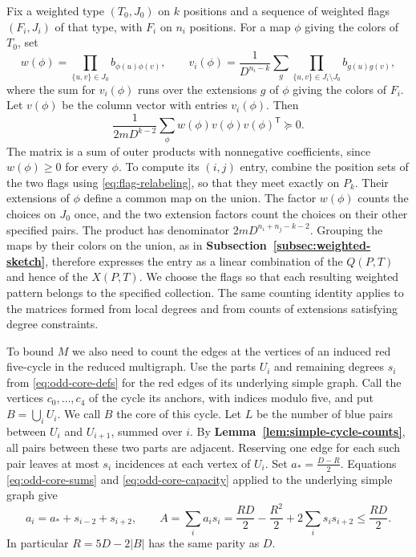 \documentclass[preprint,11pt,numbers]{elsarticle-arxiv}
\numberwithin{equation}{section}
\theoremstyle{definition}
\begin{document}
Fix a weighted type $(T_0,J_0)$ on $k$ positions and a sequence
of weighted flags $(F_i,J_i)$ of that type, with $F_i$ on $n_i$
positions. For a map $\phi$ giving the colors of $T_0$, set
\[
 w(\phi)=\prod_{\{u,v\}\in J_0}b_{\phi(u)\phi(v)},\qquad
 v_i(\phi)=\frac{1}{D^{n_i-k}}
    \sum_g\prod_{\{u,v\}\in J_i\setminus J_0}b_{g(u)g(v)},
\]
where the sum for $v_i(\phi)$ runs over the extensions $g$ of $\phi$
giving the colors of $F_i$. Let $v(\phi)$ be the column vector
with entries $v_i(\phi)$. Then
\[
 \frac{1}{2mD^{k-2}}\sum_\phi w(\phi)v(\phi)v(\phi)^{\mathsf T}\succeq0.
\]
The matrix is a sum of outer products with nonnegative coefficients,
since $w(\phi)\geq0$ for every $\phi$. To compute its $(i,j)$ entry,
combine the position sets of the two flags using
\eqref{eq:flag-relabeling}, so that they meet exactly on $P_k$.
Their extensions of $\phi$ define a common map on the union.
The factor $w(\phi)$ counts the choices on $J_0$ once, and the
two extension factors count the choices on their other specified
pairs. The product has denominator $2mD^{n_i+n_j-k-2}$.
Grouping the maps by their colors on the union, as in
\textbf{Subsection~\ref{subsec:weighted-sketch}}, therefore expresses
the entry as a linear combination of the $Q(P,T)$ and hence of
the $X(P,T)$. We choose the flags so that each resulting weighted
pattern belongs to the specified collection.
The same counting identity applies to the matrices formed from local
degrees and from counts of extensions satisfying degree constraints.

To bound $M$ we also need to count the edges at the vertices of an
induced red five-cycle in the reduced multigraph. Use the parts $U_i$
and remaining degrees $s_i$ from \eqref{eq:odd-core-defs} for the red
edges of its underlying simple graph. Call the vertices $c_0,\ldots,c_4$ of
the cycle its anchors, with indices modulo five, and put
$B=\bigcup_i U_i$. We call $B$ the core of this cycle.
Let $L$ be the number of blue pairs between $U_i$ and $U_{i+1}$,
summed over $i$. By \textbf{Lemma~\ref{lem:simple-cycle-counts}},
all pairs between these two parts are adjacent. Reserving one edge
for each such pair leaves at most $s_i$ incidences at each vertex of
$U_i$. Set $a_*=\frac{D-R}{2}$. Equations \eqref{eq:odd-core-sums}
and \eqref{eq:odd-core-capacity} applied to the underlying simple graph give
\begin{equation}\label{eq:multi-core-identities}
 a_i=a_*+s_{i-2}+s_{i+2},\qquad
 A=\sum_i a_is_i=\frac{RD}{2}-\frac{R^2}{2}
             +2\sum_i s_i s_{i+2}\le\frac{RD}{2}.
\end{equation}
In particular $R=5D-2|B|$ has the same parity as $D$.
\end{document}
